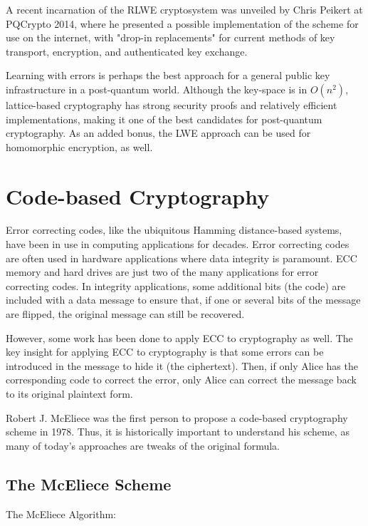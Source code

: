 \documentclass{article}
\begin{document}
A recent incarnation of the RLWE cryptosystem was unveiled by Chris Peikert at PQCrypto 2014, where he presented a possible implementation of the scheme for use on the internet, with "drop-in replacements" for current methods of key transport, encryption, and authenticated key exchange.\cite{peikert14}

Learning with errors is perhaps the best approach for a general public key infrastructure in a post-quantum world. Although the key-space is in $ O(n^2) $, lattice-based cryptography has strong security proofs and relatively efficient implementations, making it one of the best candidates for post-quantum cryptography.\cite{bernstein09} As an added bonus, the LWE approach can be used for homomorphic encryption, as well.\cite{koc15}

\section{Code-based Cryptography}

Error correcting codes, like the ubiquitous Hamming distance-based systems, have been in use in computing applications for decades. Error correcting codes are often used in hardware applications where data integrity is paramount. ECC memory and hard drives are just two of the many applications for error correcting codes. In integrity applications, some additional bits (the code) are included with a data message to ensure that, if one or several bits of the message are flipped, the original message can still be recovered.

However, some work has been done to apply ECC to cryptography as well. The key insight for applying ECC to cryptography is that some errors can be introduced in the message to hide it (the ciphertext). Then, if only Alice has the corresponding code to correct the error, only Alice can correct the message back to its original plaintext form.\cite{bernstein09}

Robert J. McEliece was the first person to propose a code-based cryptography scheme in 1978. Thus, it is historically important to understand his scheme, as many of today's approaches are tweaks of the original formula.\cite{deneuville17}

\subsection{The McEliece Scheme}

The McEliece Algorithm:\cite{bernstein09}
\end{document}
